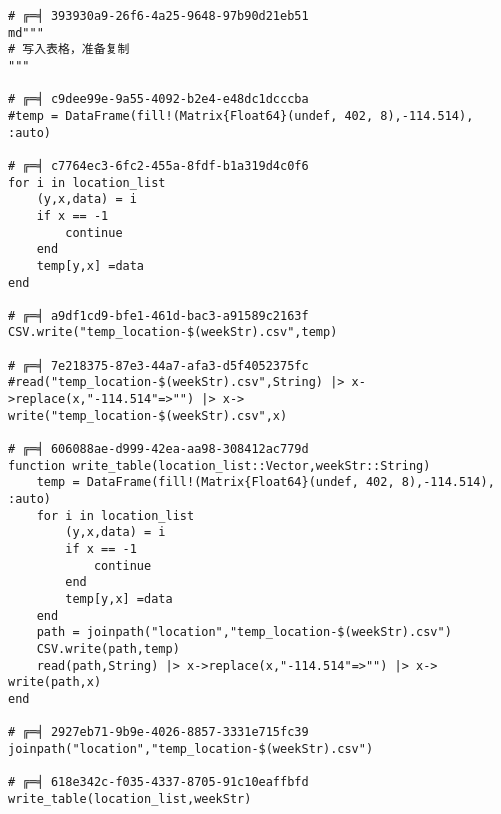 \begin{appendices}
\begin{lstlisting}
# ╔═╡ 393930a9-26f6-4a25-9648-97b90d21eb51
md"""
# 写入表格，准备复制
"""

# ╔═╡ c9dee99e-9a55-4092-b2e4-e48dc1dcccba
#temp = DataFrame(fill!(Matrix{Float64}(undef, 402, 8),-114.514), :auto)

# ╔═╡ c7764ec3-6fc2-455a-8fdf-b1a319d4c0f6
for i in location_list
	(y,x,data) = i
	if x == -1
		continue
	end
	temp[y,x] =data
end

# ╔═╡ a9df1cd9-bfe1-461d-bac3-a91589c2163f
CSV.write("temp_location-$(weekStr).csv",temp)

# ╔═╡ 7e218375-87e3-44a7-afa3-d5f4052375fc
#read("temp_location-$(weekStr).csv",String) |> x->replace(x,"-114.514"=>"") |> x-> write("temp_location-$(weekStr).csv",x)

# ╔═╡ 606088ae-d999-42ea-aa98-308412ac779d
function write_table(location_list::Vector,weekStr::String)
	temp = DataFrame(fill!(Matrix{Float64}(undef, 402, 8),-114.514), :auto)
	for i in location_list
		(y,x,data) = i
		if x == -1
			continue
		end
		temp[y,x] =data
	end
	path = joinpath("location","temp_location-$(weekStr).csv")
	CSV.write(path,temp)
	read(path,String) |> x->replace(x,"-114.514"=>"") |> x-> write(path,x)
end

# ╔═╡ 2927eb71-9b9e-4026-8857-3331e715fc39
joinpath("location","temp_location-$(weekStr).csv")

# ╔═╡ 618e342c-f035-4337-8705-91c10eaffbfd
write_table(location_list,weekStr)


\end{lstlisting}
\end{appendices}


